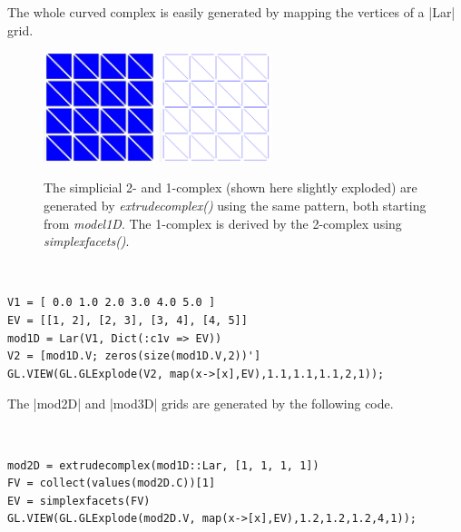 The whole curved complex is easily generated by mapping the vertices of a |Lar| grid.


\begin{figure}[] %
   \centering   
   \includegraphics[width=0.29\textwidth]{chapter-03/figs/extrude02.png}%
   \includegraphics[width=0.29\textwidth]{chapter-03/figs/extrude03.png} 
   \caption{The simplicial 2- and 1-complex (shown here slightly exploded) are generated by \emph{extrudecomplex()} using the same pattern, both starting from \emph{model1D}.
   The 1-complex is derived by the 2-complex using \emph{simplexfacets()}.}
   \label{fig:3:extrude1}
\end{figure}

\begin{coding}[1D Extrusion]\ 
\begin{lstlisting}[language=JuliaLocal, style=julia, mathescape=false]
V1 = [ 0.0 1.0 2.0 3.0 4.0 5.0 ]
EV = [[1, 2], [2, 3], [3, 4], [4, 5]]
mod1D = Lar(V1, Dict(:c1v => EV))
V2 = [mod1D.V; zeros(size(mod1D.V,2))']
GL.VIEW(GL.GLExplode(V2, map(x->[x],EV),1.1,1.1,1.1,2,1));
\end{lstlisting}
\end{coding}

The |mod2D| and |mod3D| grids are generated by the following code.

\begin{coding}[2D Extrusion]\
\begin{lstlisting}[language=JuliaLocal, style=julia, mathescape=false]
mod2D = extrudecomplex(mod1D::Lar, [1, 1, 1, 1])
FV = collect(values(mod2D.C))[1]
EV = simplexfacets(FV)
GL.VIEW(GL.GLExplode(mod2D.V, map(x->[x],EV),1.2,1.2,1.2,4,1));
\end{lstlisting}
\end{coding}

